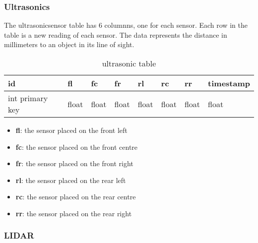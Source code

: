 \subsubsection{Ultrasonics}
The \gls{ultrasonicsensor} table has 6 columnns, one for each sensor. Each row in the table is a new reading of each sensor. The data represents the distance in millimeters to an object in its line of sight.
\begin{table}[!htb]
\centering
\caption{ultrasonic table}
\label{tab:db-ultrasonics}
\begin{tabular}{@{}llllllll@{}}
\toprule
id              & fl    & fc    & fr    & rl    & rc    & rr    & timestamp \\ \midrule
int primary key & float & float & float & float & float & float & float
\end{tabular}
\end{table}
\begin{itemize}
\item{\textbf{fl}}: the sensor placed on the front left
\item{\textbf{fc}}: the sensor placed on the front centre 
\item{\textbf{fr}}: the sensor placed on the front right
\item{\textbf{rl}}: the sensor placed on the rear left 
\item{\textbf{rc}}: the sensor placed on the rear centre
\item{\textbf{rr}}: the sensor placed on the rear right 
\end{itemize}

\subsubsection{LIDAR}
\iffalse
\gls{LIDAR} data read using SDK (C++)
Changed the output to return a JSON format
Python dictionary in this format...
Small error with the last comma breaking the JSON object so used python \lstinline{data.replace(',\n' , ']')} which replaced the last comma with a ]

Lidar class validates the data
 - removes data (angle) which is obscured by the antenna
\fi



